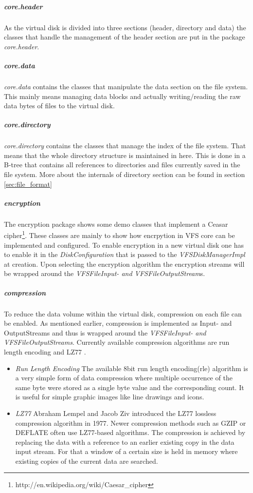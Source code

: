 \subparagraph{core.header}
As the virtual disk is divided into three sections (header, directory and data)
the classes that handle the management of the header section are put in the
package \textit{core.header}.
\subparagraph{core.data}
\textit{core.data} contains the classes that manipulate the data section on the
file system. This mainly means managing data blocks and actually writing/reading
the raw data bytes of files to the virtual disk.
\subparagraph{core.directory}
\textit{core.directory} contains the classes that manage the index of the file
system. That means that the whole directory structure is maintained in here.
This is done in a B-tree that contains all references to directories and files
currently saved in the file system. More about the internals of directory
section can be found in section \ref{sec:file_format}

\subparagraph{encryption}
The encryption package shows some demo classes that implement a Ceasar
cipher\footnote{http://en.wikipedia.org/wiki/Caesar\_cipher}. These classes are
mainly to show how encrpytion in VFS core can be implemented and configured. To
enable encryption in a new virtual disk one has to enable it in the
\textit{DiskConfiguration} that is passed to the \textit{VFSDiskManagerImpl} at
creation. Upon selecting the encryption algorithm the encryption streams will be
wrapped around the \textit{VFSFileInput- and VFSFileOutputStream}s.

\subparagraph{compression}

To reduce the data volume within the virtual disk, compression on each file can
be enabled. As mentioned earlier, compression is implemented as Input- and
OutputStreams and thus is wrapped around the \textit{VFSFileInput- and
VFSFileOutputStreams}. Currently available compression algorithms are run length
encoding \cite{rle} and LZ77 \cite{lz77}\cite{lz772}.

\begin{itemize}
  \item {\textit{Run Length Encoding}} The available 8bit run length
  encoding(rle) algorithm is a very simple form of data compression where
  multiple occurrence of the same byte were stored as a single byte value and
  the corresponding count. It is useful for simple graphic images like line
  drawings and icons.
  \item {\textit{LZ77}} Abraham Lempel and Jacob Ziv introduced the LZ77 lossless
  compression algorithm in 1977. Newer compression methods such as GZIP or DEFLATE often use LZ77-based
  algorithms. The compression is achieved by replacing the data with a reference
  to an earlier existing copy in the data input stream. For that a window of
  a certain size is held in memory where existing copies of the current data are
  searched.
\end{itemize}


